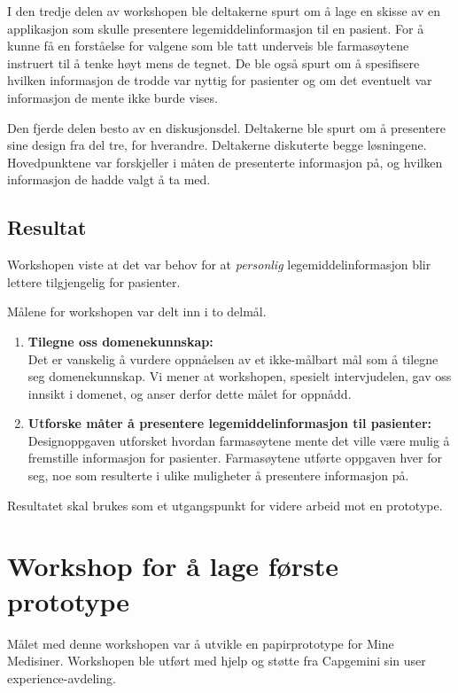 I den tredje delen av workshopen ble deltakerne spurt om å lage en skisse av en applikasjon som skulle presentere legemiddelinformasjon til en pasient. For å kunne få en forståelse for valgene som ble tatt underveis ble farmasøytene instruert til å tenke høyt mens de tegnet. De ble også spurt om å spesifisere hvilken informasjon de trodde var nyttig for pasienter og om det eventuelt var informasjon de mente ikke burde vises.

Den fjerde delen besto av en diskusjonsdel. Deltakerne ble spurt om å presentere sine design fra del tre, for hverandre. Deltakerne diskuterte begge løsningene. Hovedpunktene var forskjeller i måten de presenterte informasjon på, og hvilken informasjon de hadde valgt å ta med. 

\subsection{Resultat}
Workshopen viste at det var behov for at \textit{personlig} legemiddelinformasjon blir lettere tilgjengelig for pasienter.

Målene for workshopen var delt inn i to delmål.  
\begin{enumerate}
\item \textbf{Tilegne oss domenekunnskap:}\\
Det er vanskelig å vurdere oppnåelsen av et ikke-målbart mål som å tilegne seg domenekunnskap. Vi mener at workshopen, spesielt intervjudelen, gav oss innsikt i domenet, og  anser derfor dette målet for oppnådd.

\item \textbf{Utforske måter å presentere legemiddelinformasjon til pasienter:}\\
Designoppgaven utforsket hvordan farmasøytene mente det ville være mulig å fremstille informasjon for pasienter. Farmasøytene utførte oppgaven hver for seg, noe som resulterte i ulike muligheter å presentere informasjon på.
\end{enumerate}

Resultatet skal brukes som et utgangspunkt for videre arbeid mot en prototype. 

\section{Workshop for å lage første prototype} \label{sec:workshopDesign}
Målet med denne workshopen var å utvikle en papirprototype for Mine Medisiner. Workshopen ble utført med hjelp og støtte fra Capgemini sin user experience-avdeling.

